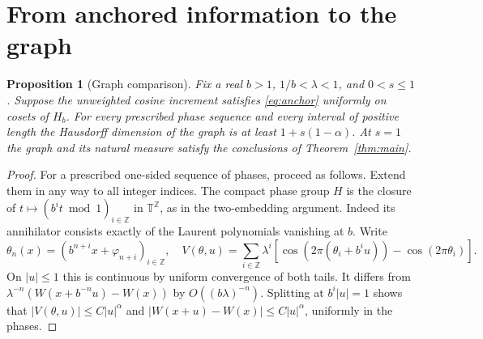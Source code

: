 \documentclass[11pt,a4paper]{article}
\newtheorem{proposition}[theorem]{Proposition}
\newcommand{\T}{\mathbb T}
\begin{document}
\appendix
\section{From anchored information to the graph}\label{app:graph}
\begin{proposition}[Graph comparison]\label{prop:graph}
Fix a real $b>1$, $1/b<\lambda<1$, and $0<s\le1$.
Suppose the unweighted cosine increment satisfies \eqref{eq:anchor}
uniformly on cosets of $H_b$. For every prescribed phase sequence and
every interval of positive length the Hausdorff dimension of the graph
is at least $1+s(1-\alpha)$. At $s=1$ the graph and its natural measure
satisfy the conclusions of Theorem~\ref{thm:main}.
\end{proposition}
\begin{proof}
For a prescribed one-sided sequence of phases, proceed as follows. Extend them in any way to all integer indices. The compact phase group $H$ is the closure of $t\mapsto(b^it\bmod1)_{i\in\mathbb Z}$ in $\T^{\mathbb Z}$, as in the two-embedding argument. Indeed its annihilator consists exactly of the Laurent polynomials vanishing at $b$. Write
\[
 \theta_n(x)=(b^{n+i}x+\varphi_{n+i})_{i\in\mathbb Z},
 \quad V(\theta,u)=\sum_{i\in\mathbb Z}\lambda^i
 [\cos(2\pi(\theta_i+b^iu))-\cos(2\pi\theta_i)].
\]
On $|u|\le1$ this is continuous by uniform convergence of both tails. It differs from $\lambda^{-n}(W(x+b^{-n}u)-W(x))$ by $O((b\lambda)^{-n})$. Splitting at $b^i|u|=1$ shows that $|V(\theta,u)|\le C|u|^\alpha$ and $|W(x+u)-W(x)|\le C|u|^\alpha$, uniformly in the phases.


\end{proof}
\end{document}
